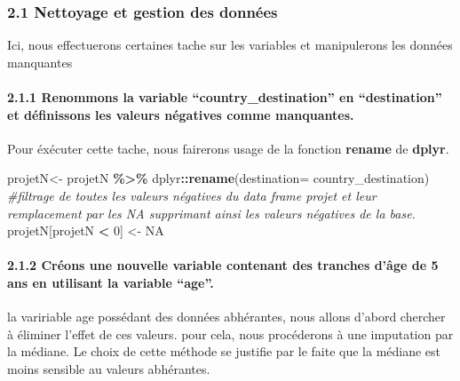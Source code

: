 \documentclass[
]{article}
\newenvironment{Shaded}{\begin{snugshade}}{\end{snugshade}}
\newcommand{\AttributeTok}[1]{\textcolor[rgb]{0.13,0.29,0.53}{#1}}
\newcommand{\CommentTok}[1]{\textcolor[rgb]{0.56,0.35,0.01}{\textit{#1}}}
\newcommand{\ConstantTok}[1]{\textcolor[rgb]{0.56,0.35,0.01}{#1}}
\newcommand{\DecValTok}[1]{\textcolor[rgb]{0.00,0.00,0.81}{#1}}
\newcommand{\FunctionTok}[1]{\textcolor[rgb]{0.13,0.29,0.53}{\textbf{#1}}}
\newcommand{\NormalTok}[1]{#1}
\newcommand{\OtherTok}[1]{\textcolor[rgb]{0.56,0.35,0.01}{#1}}
\newcommand{\SpecialCharTok}[1]{\textcolor[rgb]{0.81,0.36,0.00}{\textbf{#1}}}
\begin{document}
\hypertarget{nettoyage-et-gestion-des-donnuxe9es}{%
\subsubsection{2.1 Nettoyage et gestion des
données}\label{nettoyage-et-gestion-des-donnuxe9es}}

Ici, nous effectuerons certaines tache sur les variables et manipulerons
les données manquantes

\hypertarget{renommons-la-variable-country_destination-en-destination-et-duxe9finissons-les-valeurs-nuxe9gatives-comme-manquantes.}{%
\paragraph{2.1.1 Renommons la variable ``country\_destination'' en
``destination'' et définissons les valeurs négatives comme
manquantes.}\label{renommons-la-variable-country_destination-en-destination-et-duxe9finissons-les-valeurs-nuxe9gatives-comme-manquantes.}}

Pour éxécuter cette tache, nous fairerons usage de la fonction
\textbf{rename} de \textbf{dplyr}.

\begin{Shaded}
\begin{Highlighting}[]
\NormalTok{projetN}\OtherTok{\textless{}{-}}\NormalTok{ projetN }\SpecialCharTok{\%\textgreater{}\%}\NormalTok{ dplyr}\SpecialCharTok{::}\FunctionTok{rename}\NormalTok{(}\AttributeTok{destination=}\NormalTok{ country\_destination)}
\CommentTok{\#filtrage de toutes les valeurs négatives du data frame projet et leur remplacement par les NA supprimant ainsi les valeurs négatives de la base.}
\NormalTok{projetN[projetN }\SpecialCharTok{\textless{}} \DecValTok{0}\NormalTok{] }\OtherTok{\textless{}{-}} \ConstantTok{NA} 
\end{Highlighting}
\end{Shaded}

\hypertarget{cruxe9ons-une-nouvelle-variable-contenant-des-tranches-duxe2ge-de-5-ans-en-utilisant-la-variable-age.}{%
\paragraph{2.1.2 Créons une nouvelle variable contenant des tranches
d'âge de 5 ans en utilisant la variable
``age''.}\label{cruxe9ons-une-nouvelle-variable-contenant-des-tranches-duxe2ge-de-5-ans-en-utilisant-la-variable-age.}}

la variriable age possédant des données abhérantes, nous allons d'abord
chercher à éliminer l'effet de ces valeurs. pour cela, nous procéderons
à une imputation par la médiane. Le choix de cette méthode se justifie
par le faite que la médiane est moins sensible au valeurs abhérantes.
\end{document}
